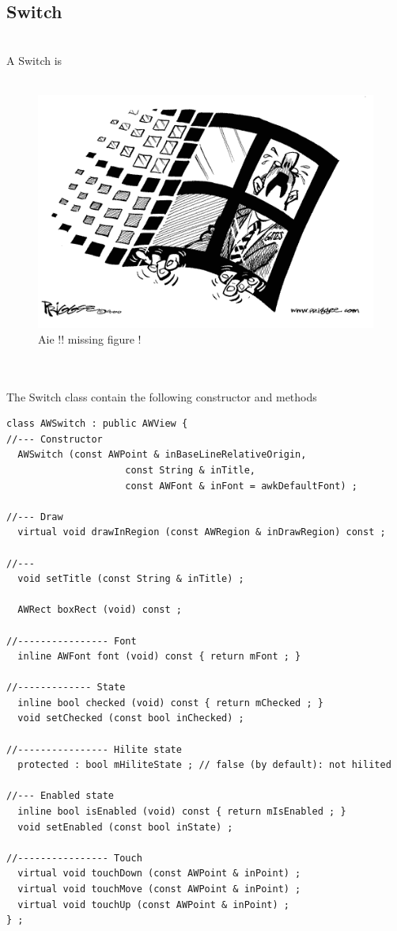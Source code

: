 \documentclass[a4paper,11pt]{extarticle}
\begin{document}
\newpage
\subsection{Switch}

~\\ A Switch is 
~\\
~\\

\begin{figure}[htbp]
   \centering
   \includegraphics[scale=0.55]{AWFig.png} 
   \caption{Aie !! missing figure !}
   \label{fig:15 }
\end{figure}

~\\

~\\ The Switch class contain the following constructor and methods

\begin{lstlisting}[language=Arduinonl]
class AWSwitch : public AWView {
//--- Constructor
  AWSwitch (const AWPoint & inBaseLineRelativeOrigin,
                     const String & inTitle,
                     const AWFont & inFont = awkDefaultFont) ;

//--- Draw
  virtual void drawInRegion (const AWRegion & inDrawRegion) const ;

//---
  void setTitle (const String & inTitle) ;

  AWRect boxRect (void) const ;

//---------------- Font
  inline AWFont font (void) const { return mFont ; }

//------------- State
  inline bool checked (void) const { return mChecked ; }
  void setChecked (const bool inChecked) ;

//---------------- Hilite state
  protected : bool mHiliteState ; // false (by default): not hilited

//--- Enabled state
  inline bool isEnabled (void) const { return mIsEnabled ; }
  void setEnabled (const bool inState) ;

//---------------- Touch
  virtual void touchDown (const AWPoint & inPoint) ;
  virtual void touchMove (const AWPoint & inPoint) ;
  virtual void touchUp (const AWPoint & inPoint) ;
} ;
\end{lstlisting}
\end{document}
